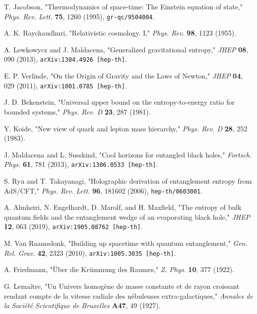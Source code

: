 \documentclass[11pt, letterpaper]{report}
\theoremstyle{plain} %
\theoremstyle{definition} %
\theoremstyle{remark} %
\begin{document}
\begin{thebibliography}{99}
T. Jacobson, "Thermodynamics of space-time: The Einstein equation of state," \textit{Phys. Rev. Lett.} \textbf{75}, 1260 (1995), \texttt{gr-qc/9504004}.

A. K. Raychaudhuri, "Relativistic cosmology. I," \textit{Phys. Rev.} \textbf{98}, 1123 (1955).

A. Lewkowycz and J. Maldacena, "Generalized gravitational entropy," \textit{JHEP} \textbf{08}, 090 (2013), \texttt{arXiv:1304.4926 [hep-th]}.

E. P. Verlinde, "On the Origin of Gravity and the Laws of Newton," \textit{JHEP} \textbf{04}, 029 (2011), \texttt{arXiv:1001.0785 [hep-th]}.

J. D. Bekenstein, "Universal upper bound on the entropy-to-energy ratio for bounded systems," \textit{Phys. Rev. D} \textbf{23}, 287 (1981).

Y. Koide, "New view of quark and lepton mass hierarchy," \textit{Phys. Rev. D} \textbf{28}, 252 (1983).

J. Maldacena and L. Susskind, "Cool horizons for entangled black holes," \textit{Fortsch. Phys.} \textbf{61}, 781 (2013), \texttt{arXiv:1306.0533 [hep-th]}.

\label{Ryu2006Holographic}
S. Ryu and T. Takayanagi, "Holographic derivation of entanglement entropy from AdS/CFT," \textit{Phys. Rev. Lett.} \textbf{96}, 181602 (2006), \texttt{hep-th/0603001}.

\label{Almheiri2019Islands}
A. Almheiri, N. Engelhardt, D. Marolf, and H. Maxfield, "The entropy of bulk quantum fields and the entanglement wedge of an evaporating black hole," \textit{JHEP} \textbf{12}, 063 (2019), \texttt{arXiv:1905.08762 [hep-th]}.

M. Van Raamsdonk, "Building up spacetime with quantum entanglement," \textit{Gen. Rel. Grav.} \textbf{42}, 2323 (2010), \texttt{arXiv:1005.3035 [hep-th]}.

A. Friedmann, "Über die Krümmung des Raumes," \textit{Z. Phys.} \textbf{10}, 377 (1922).

G. Lemaître, "Un Univers homogène de masse constante et de rayon croissant rendant compte de la vitesse radiale des nébuleuses extra-galactiques," \textit{Annales de la Société Scientifique de Bruxelles} \textbf{A47}, 49 (1927).


\end{thebibliography}
\end{document}
